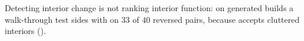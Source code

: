 Detecting interior change is not ranking interior function: on generated builds a
walk-through test sides with \mvkid{} on $33$ of $40$ reversed pairs, because \vkid{} accepts
cluttered interiors ().
